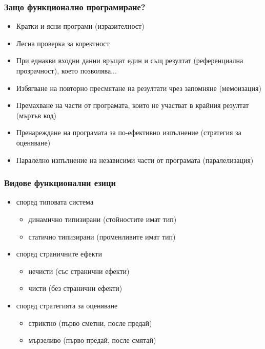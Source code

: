 \documentclass{beamer}
\begin{document}
\begin{frame}
  \frametitle{Защо функционално програмиране?}

  \begin{itemize}[<+->]
  \item Кратки и ясни програми (изразителност)
  \item Лесна проверка за коректност
  \item При еднакви входни данни връщат един и същ резултат (референциална прозрачност), \pause което позволява...
  \item Избягване на повторно пресмятане на резултати чрез запомняне (мемоизация)
  \item Премахване на части от програмата, които не участват в крайния резултат (мъртъв код)
  \item Пренареждане на програмата за по-ефективно изпълнение (стратегия за оценяване)
  \item Паралелно изпълнение на независими части от програмата (паралелизация)
  \end{itemize}
\end{frame}

\begin{frame}[<1-2>]
  \frametitle{Видове функционални езици}

  \begin{itemize}
  \item според типовата система
    \begin{itemize}
    \item динамично типизирани (стойностите имат тип) 
    \item статично типизирани (променливите имат тип) 
    \end{itemize}
  \item според страничните ефекти
    \begin{itemize}
    \item нечисти (със странични ефекти) 
    \item чисти (без странични ефекти) 
    \end{itemize}
  \item според стратегията за оценяване
    \begin{itemize}
    \item стриктно (първо сметни, после предай)  
    \item мързеливо (първо предай, после смятай) 
    \end{itemize}
  \end{itemize}

  \pause
\end{frame}
\end{document}
